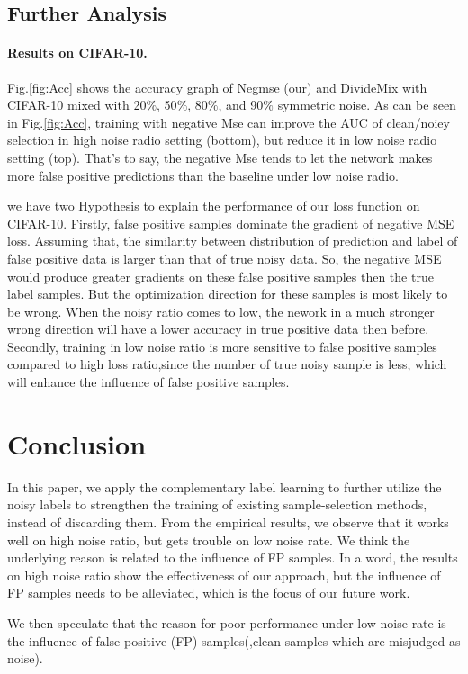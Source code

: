 \documentclass[10pt,twocolumn,letterpaper]{article}
\begin{document}
\subsection{Further Analysis}
\paragraph{Results on CIFAR-10.}Fig.\ref{fig:Acc} shows the accuracy graph of Negmse (our) and DivideMix with CIFAR-10 mixed with 20$\%$, 50$\%$, 80$\%$, and 90$\%$ symmetric noise. As can be seen in Fig.\ref{fig:Acc}, training with negative Mse can improve the AUC of clean/noiey selection in high noise radio setting (bottom), but reduce it in low noise radio setting (top). That's to say, the negative Mse tends to let the network makes more false positive predictions than the baseline under low noise radio.

we have two Hypothesis to explain the performance of our loss function on CIFAR-10. Firstly, false positive samples dominate the gradient of negative MSE loss. Assuming that, the similarity between distribution of prediction and label of false positive data is larger than that of true noisy data. So, the negative MSE would produce greater gradients on these false positive samples then the true label samples. But the optimization direction for these samples is most likely to be wrong. When the noisy ratio comes to low, the nework in a much stronger wrong direction will have  a lower accuracy in true positive data then before. Secondly, training in low noise ratio is more sensitive to false positive samples compared to high loss ratio,since the number of true noisy sample is less, which will enhance the influence of false positive samples.

\section{Conclusion}
In this paper, we apply the complementary label learning to further utilize the noisy labels to strengthen the training of existing sample-selection methods, instead of discarding them. From the empirical results, we observe that it works well on high noise ratio, but gets trouble on low noise rate. We think the underlying reason is related to the influence of FP samples. In a word, the results on high noise ratio show the effectiveness of our approach, but the influence of FP samples needs to be alleviated, which is the focus of our future work.

We then speculate that the reason for poor performance under low noise rate is the influence of false positive (FP) samples(\ie,clean samples which are misjudged as noise). 


{\small


}
\end{document}
